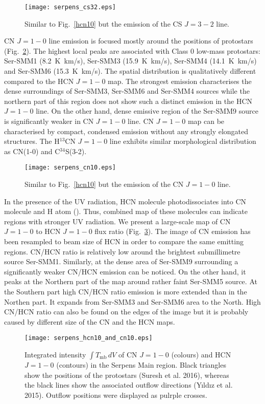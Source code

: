 \documentclass{aa}
\begin{document}
\begin{figure}
\texttt{[image: serpens\_cs32.eps]}
\caption{Similar to Fig.~\ref{hcn10} but the emission of the CS $J=3-2$ line.}
\label{cs32}
\end{figure}

CN $J=1-0$ line emission is focused mostly around the positions of protostars (Fig.~\ref{cn10}). 
The highest local peaks are associated with Class 0 low-mass protostars: Ser-SMM1 (8.2~K~km/s), Ser-SMM3 (15.9~K~km/s), Ser-SMM4 (14.1~K~km/s) and Ser-SMM6 (15.3~K~km/s). The spatial distribution is qualitatively different compared to the HCN $J=1-0$ map. The strongest emission characterises the dense surroundings of Ser-SMM3, Ser-SMM6 and Ser-SMM4 sources while the northern part of this region does not show such a distinct emission in the HCN $J=1-0$ line. On the other hand, dense emissive region of the Ser-SMM9 source is significantly weaker in CN $J=1-0$ line. CN $J=1-0$ map can be characterised by compact, condensed emission without any strongly elongated structures. The H$^{13}$CN $J=1-0$ line exhibits similar morphological distribution as CN(1-0) and \mbox{C$^{34}$S(3-2)}. 

\begin{figure}
\texttt{[image: serpens\_cn10.eps]}
\caption{Similar to Fig.~\ref{hcn10} but the emission of the CN $J=1-0$ line.}
\label{cn10}
\end{figure}

In the presence of the UV radiation, HCN molecule photodissociates into CN molecule and H atom (\cite{Sta05}). Thus, combined map of these molecules can indicate regions with stronger UV radiation. We present a large-scale map of CN $J=1-0$ to HCN $J=1-0$ flux ratio (Fig.~\ref{cn10_div_hcn10}). The image of CN emission has been resampled to beam size of HCN in order to compare the same emitting regions. CN/HCN ratio is relatively low around the brightest submillimetre source Ser-SMM1. Similarly, at the dense area of Ser-SMM9 surrounding a significantly weaker CN/HCN emission can be noticed. On the other hand, it peaks at the Northern part of the map around rather faint Ser-SMM5 source. At the Southern part high CN/HCN ratio emission is more extended than in the Northen part. It expands from Ser-SMM3 and Ser-SMM6 area to the North. High CN/HCN ratio can also be found on the edges of the image but it is probably caused by different size of the CN and the HCN maps.

\begin{figure}
   \centering
   \texttt{[image: serpens\_hcn10\_and\_cn10.eps]}
      \caption{Integrated intensity $\int T_\mathrm{mb}\, dV$ of CN $J=1-0$ (colours) and HCN $J=1-0$ (contours) in the Serpens Main region. Black triangles show the positions of the protostars (Suresh et al. 2016), whereas the black lines show the associated outflow directions (Y{\i}ld{\i}z et al. 2015). Outflow positions were displayed as pulrple crosses.}
         \label{cn10_div_hcn10}
   \end{figure}
\end{document}
